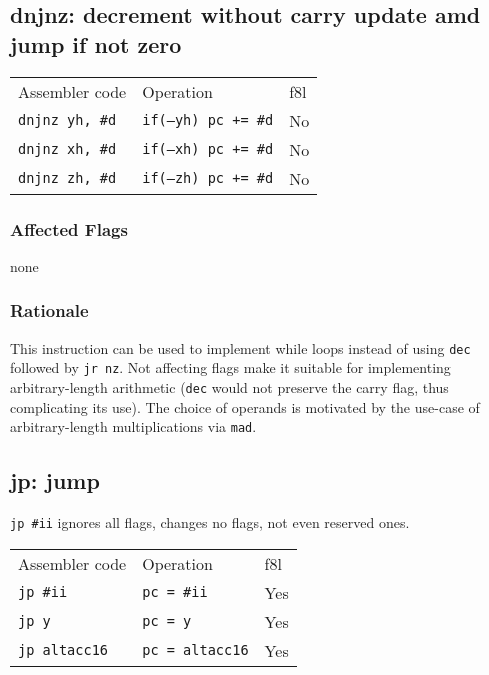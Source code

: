 \documentclass{book}
\begin{document}
\subsection{dnjnz: decrement without carry update amd jump if not zero}

\begin{tabular}{l l l}
Assembler code         & Operation                   & f8l \\
\texttt{dnjnz yh, \#d} & \texttt{if(--yh) pc += \#d} & No \\
\texttt{dnjnz xh, \#d} & \texttt{if(--xh) pc += \#d} & No \\
\texttt{dnjnz zh, \#d} & \texttt{if(--zh) pc += \#d} & No \\
\end{tabular}

\subsubsection*{Affected Flags}

none

\subsubsection*{Rationale}

This instruction can be used to implement while loops instead of using \texttt{dec} followed by \texttt{jr nz}. Not affecting flags make it suitable for implementing arbitrary-length arithmetic (\texttt{dec} would not preserve the carry flag, thus complicating its use). The choice of operands is motivated by the use-case of arbitrary-length multiplications via \texttt{mad}.


\subsection{jp: jump}

\texttt{jp \#ii} ignores all flags, changes no flags, not even reserved ones.

\begin{tabular}{l l l}
Assembler code       & Operation              & f8l \\
\texttt{jp \#ii}     & \texttt{pc = \#ii}     & Yes \\
\texttt{jp y}        & \texttt{pc = y}        & Yes \\
\texttt{jp altacc16} & \texttt{pc = altacc16} & Yes \\
\end{tabular}
\end{document}
